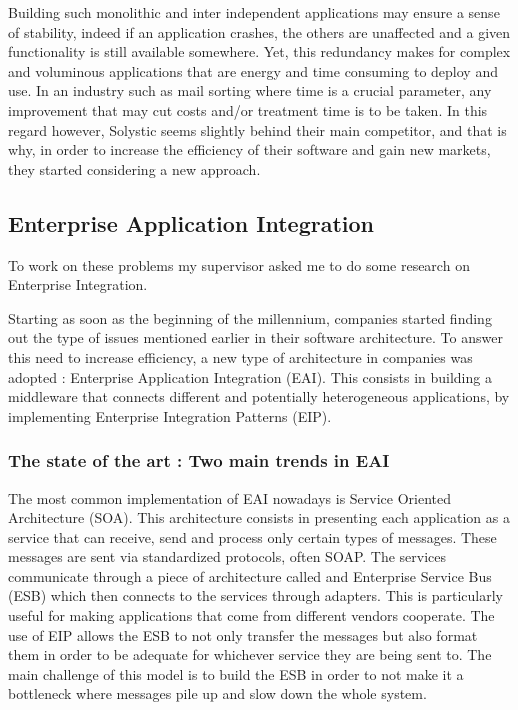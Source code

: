 \documentclass[12pt,a4paper,twoside]{article}
\begin{document}
Building such monolithic and inter independent applications may ensure a sense of stability, indeed if an application crashes, the others are unaffected and a given functionality is still available somewhere. Yet, this redundancy makes for complex and voluminous applications that are energy and time consuming to deploy and use. In an industry such as mail sorting where time is a crucial parameter, any improvement that may cut costs and/or treatment time is to be taken. In this regard however, Solystic seems slightly behind their main competitor, and that is why, in order to increase the efficiency of their software and gain new markets, they started considering a new approach.

\subsection{Enterprise Application Integration}
To work on these problems my supervisor asked me to do some research on Enterprise Integration.


Starting as soon as the beginning of the millennium, companies started finding out the type of issues mentioned earlier in their software architecture. To answer this need to increase efficiency, a new type of architecture in companies was adopted : Enterprise Application Integration (EAI). This consists in building a middleware that connects different and potentially heterogeneous applications, by implementing Enterprise Integration Patterns (EIP).

\subsubsection{The state of the art : Two main trends in EAI}
The most common implementation of EAI nowadays is Service Oriented Architecture (SOA). This architecture consists in presenting each application as a service that can receive, send and process only certain types of messages. These messages are sent via standardized protocols, often SOAP. The services communicate through a piece of architecture called and Enterprise Service Bus (ESB) which then connects to the services through adapters. This is particularly useful for making applications that come from different vendors cooperate. The use of EIP allows the ESB to not only transfer the messages but also format them in order to be adequate for whichever service they are being sent to. The main challenge of this model is to build the ESB in order to not make it a bottleneck where messages pile up and slow down the whole system.
\end{document}
